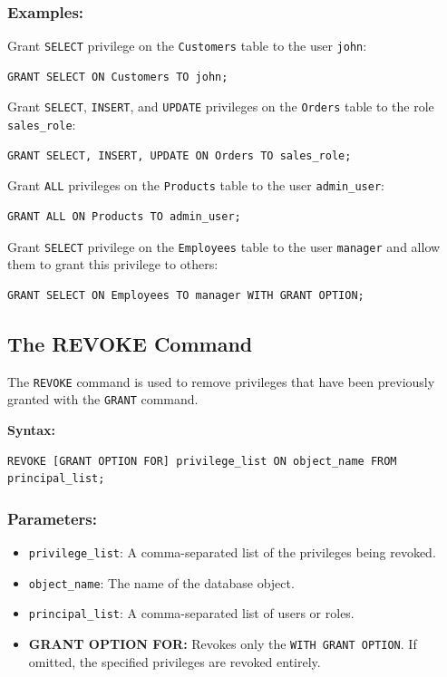 \documentclass[12pt,a4paper]{article}
\begin{document}
\subsubsection*{Examples:}

Grant \texttt{SELECT} privilege on the \texttt{Customers} table to the user \texttt{john}:
\begin{verbatim}
GRANT SELECT ON Customers TO john;
\end{verbatim}

Grant \texttt{SELECT}, \texttt{INSERT}, and \texttt{UPDATE} privileges on the \texttt{Orders} table to the role \texttt{sales\_role}:
\begin{verbatim}
GRANT SELECT, INSERT, UPDATE ON Orders TO sales_role;
\end{verbatim}

Grant \texttt{ALL} privileges on the \texttt{Products} table to the user \texttt{admin\_user}:
\begin{verbatim}
GRANT ALL ON Products TO admin_user;
\end{verbatim}

Grant \texttt{SELECT} privilege on the \texttt{Employees} table to the user \texttt{manager} and allow them to grant this privilege to others:
\begin{verbatim}
GRANT SELECT ON Employees TO manager WITH GRANT OPTION;
\end{verbatim}

\subsection{The REVOKE Command}
The \texttt{REVOKE} command is used to remove privileges that have been previously granted with the \texttt{GRANT} command.

\textbf{Syntax:}
\begin{verbatim}
REVOKE [GRANT OPTION FOR] privilege_list ON object_name FROM principal_list;
\end{verbatim}

\subsubsection*{Parameters:}
\begin{itemize}
    \item \texttt{privilege\_list}: A comma-separated list of the privileges being revoked.
    \item \texttt{object\_name}: The name of the database object.
    \item \texttt{principal\_list}: A comma-separated list of users or roles.
    \item \textbf{GRANT OPTION FOR:} Revokes only the \texttt{WITH GRANT OPTION}. If omitted, the specified privileges are revoked entirely.
\end{itemize}
\end{document}
